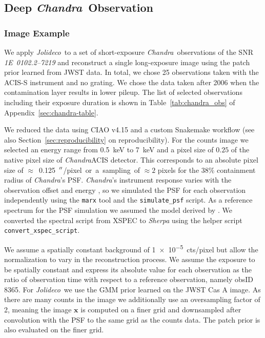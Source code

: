 \documentclass[twocolumn, lineno]{aastex631}
\newcommand{\chandra}{\textit{Chandra}~}
\newcommand{\chandranospace}{\textit{Chandra}}
\newcommand{\jolideco}{\textit{Jolideco}~}
\begin{document}
    \subsection{Deep \chandra Observation}
    \label{sec:chandra-example}
    \subsubsection{Image Example}
    We apply \jolideco to a set of short-exposure \chandra observations of the SNR \textit{1E~0102.2–7219} and reconstruct a single long-exposure image using the patch prior learned from JWST data. In total, we chose 25 observations taken with  the ACIS-S instrument and no grating. We chose the data taken after 2006 when the contamination layer results in lower pileup. The list of selected observations including their exposure duration is shown in Table~\ref{tab:chandra_obs} of Appendix~\ref{sec:chandra-table}.

    We reduced the data using CIAO v4.15 \citep{Fruscione2006} and a custom Snakemake workflow (see also Section~\ref{sec:reproducibility} on reproducibility). For the counts image we selected an energy range from \qty[mode = text]{0.5}{keV} to  \qty[mode = text]{7}{keV} and a pixel size of $0.25$ of the native pixel size of \chandranospace ACIS detector. This corresponds to an absolute  pixel size of $\approx$~\qty[mode = text]{0.125}{$\mbox{$^{\prime\prime}$}$/pixel} or a sampling of $\approx2$ pixels for the $38\%$ containment radius of \chandranospace's PSF. \chandranospace's instrument response varies with the observation offset and energy \citep{ChandraPOG2022}, so we simulated the PSF for each observation independently using the \texttt{marx} tool \citep{Davis2012} and the \texttt{simulate\_psf} script. As a reference spectrum for the PSF simulation we assumed the model derived by \cite{Plucinsky2017}. We converted the spectral script from XSPEC to {\it Sherpa} using the helper script \texttt{convert\_xspec\_script}.

    We assume a spatially constant background of \qty[mode = text]{1e-5}{cts/pixel} but allow the normalization to vary in the reconstruction process. We assume the exposure to be spatially constant and express its absolute value for each observation as the ratio of observation time with respect to a reference observation, namely obsID 8365. For \jolideco we use the GMM prior learned on the JWST Cas A image. As there are many counts in the image we additionally use an oversampling factor of 2, meaning the image $\mathbf{x}$ is computed on a finer grid and downsampled after convolution with the PSF to the same grid as the counts data. The patch prior is also evaluated on the finer grid.
    
\end{document}
